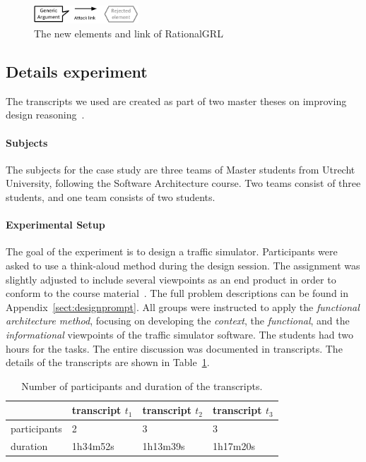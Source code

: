 \begin{figure}[h]
\centering
\includegraphics[width=0.35\textwidth]{img/legend}
\caption{The new elements and link of RationalGRL}
\label{fig:rationalgrllegend}
\end{figure}

\subsection{Details experiment}

The transcripts we used are created as part of two master theses on improving design reasoning~\cite{masterthesis1,masterthesis2}.

\paragraph{Subjects} The subjects for the case study are three teams of Master students from Utrecht University, following the Software Architecture course. Two teams consist of three students, and one team consists of two students.

\paragraph{Experimental Setup} The goal of the experiment is to design a traffic simulator. Participants were asked to use a think-aloud method during the design session. The assignment was slightly adjusted to include several viewpoints as an end product in order to conform to the course material~\cite{Bass:2012:SAP:2392670}. The full problem descriptions can be found in Appendix~\ref{sect:designprompt}. All groups were instructed to apply the \emph{functional architecture method}, focusing on developing the \emph{context}, the \emph{functional}, and the \emph{informational} viewpoints of the traffic simulator software. The students had two hours for the tasks. The entire discussion was documented in transcripts. The details of the transcripts are shown in Table~\ref{table:transcripts:info}.

\begin{table}[ht]
\centering
\begin{tabular}{|l|l|l|l|}
\hline
& transcript $t_1$ & transcript $t_2$ & transcript $t_3$\\
\hline
participants & 2 & 3 & 3\\
\hline
duration & 1h34m52s & 1h13m39s & 1h17m20s\\
\hline
\end{tabular}
\caption{Number of participants and duration of the transcripts.}
\label{table:transcripts:info}
\end{table}

